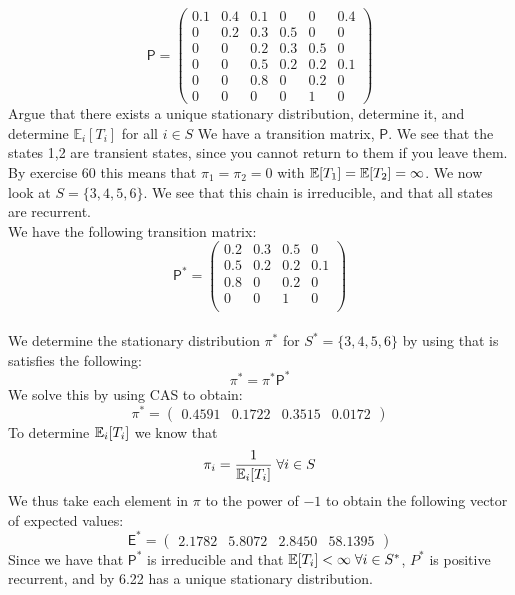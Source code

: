 \documentclass{Class}
\begin{document}
$$
\mathsf{P}=\left(\begin{array}{cccccc}
0.1 & 0.4 & 0.1 & 0 & 0 & 0.4 \\
0 & 0.2 & 0.3 & 0.5 & 0 & 0 \\
0 & 0 & 0.2 & 0.3 & 0.5 & 0 \\
0 & 0 & 0.5 & 0.2 & 0.2 & 0.1 \\
0 & 0 & 0.8 & 0 & 0.2 & 0 \\
0 & 0 & 0 & 0 & 1 & 0
\end{array}\right)
$$
Argue that there exists a unique stationary distribution, determine it, and determine $\mathbb{E}_i\left[T_i\right]$ for all $i \in S$
\solution
We have a transition matrix, $\mathsf{P}$. We see that the states 1,2 are transient states, since you cannot return to them if you leave them. By exercise 60 this means that $\pi_1=\pi_2=0$ with $\E[T_1]=\E[T_2]=\infty$. We now look at $S=\{3,4,5,6\}$. We see that this chain is irreducible, and that all states are recurrent.
\\We have the following transition matrix:
 $$
\mathsf{P}^*=\left(\begin{array}{cccc}

0.2 & 0.3 & 0.5 & 0 \\
0.5 & 0.2 & 0.2 & 0.1 \\
0.8 & 0 & 0.2 & 0 \\
0 & 0 & 1 & 0\\
\end{array}\right)
$$
\\We determine the stationary distribution $\pi^*$ for $S^*=\{3,4,5,6\}$ by using that is satisfies the following:
$$\pi^* = \pi^*\mathsf{P}^*$$
We solve this by using CAS to obtain:
$$\pi^* = \begin{pmatrix}
   0.4591&0.1722&0.3515&0.0172
\end{pmatrix}$$
To determine $\E_i[T_i]$ we know that $$\pi_i= \frac{1}{\E_i[T_i]}\;\forall i\in S$$
We thus take each element in $\pi$ to the power of $-1$ to obtain the following vector of expected values:
$$\mathsf{E}^*=\begin{pmatrix}
     2.1782 & 5.8072 & 2.8450 & 58.1395
\end{pmatrix}$$
Since we have that $\mathsf{P}^*$ is irreducible and that $\E[T_i]<\infty \;\forall i\in S^*$, $P^*$ is positive recurrent, and by 6.22 has a unique stationary distribution. 
\end{document}
